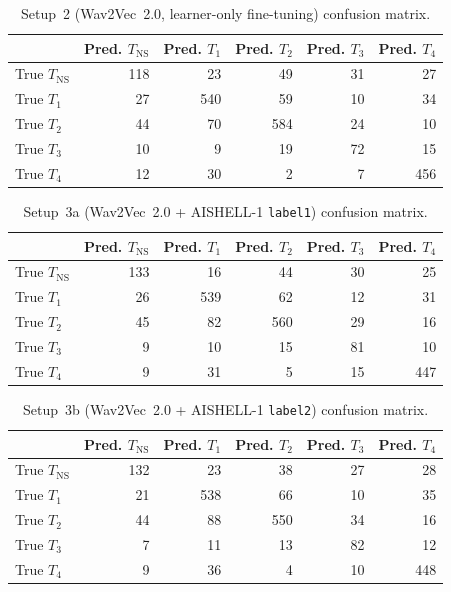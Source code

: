 \begin{table}[H]
\centering
\caption{Setup~2 (Wav2Vec~2.0, learner-only fine-tuning) confusion matrix.}
\label{tab:app:cm_w2v_learner}
\small
\begin{tabular}{@{}lrrrrr@{}}
\toprule
 & \textbf{Pred. \(T_{\mathrm{NS}}\)} & \textbf{Pred. \(T_1\)} & \textbf{Pred. \(T_2\)} & \textbf{Pred. \(T_3\)} & \textbf{Pred. \(T_4\)} \\
\midrule
True \(T_{\mathrm{NS}}\) & 118 &  23 &  49 & 31 &  27 \\
True \(T_1\)             &  27 & 540 &  59 & 10 &  34 \\
True \(T_2\)             &  44 &  70 & 584 & 24 &  10 \\
True \(T_3\)             &  10 &   9 &  19 & 72 &  15 \\
True \(T_4\)             &  12 &  30 &   2 &  7 & 456 \\
\bottomrule
\end{tabular}
\end{table}

\begin{table}[H]
\centering
\caption{Setup~3a (Wav2Vec~2.0 + AISHELL-1 \texttt{label1}) confusion matrix.}
\label{tab:app:cm_w2v_aishell_l1}
\small
\begin{tabular}{@{}lrrrrr@{}}
\toprule
 & \textbf{Pred. \(T_{\mathrm{NS}}\)} & \textbf{Pred. \(T_1\)} & \textbf{Pred. \(T_2\)} & \textbf{Pred. \(T_3\)} & \textbf{Pred. \(T_4\)} \\
\midrule
True \(T_{\mathrm{NS}}\) & 133 &  16 &  44 & 30 &  25 \\
True \(T_1\)             &  26 & 539 &  62 & 12 &  31 \\
True \(T_2\)             &  45 &  82 & 560 & 29 &  16 \\
True \(T_3\)             &   9 &  10 &  15 & 81 &  10 \\
True \(T_4\)             &   9 &  31 &   5 & 15 & 447 \\
\bottomrule
\end{tabular}
\end{table}

\begin{table}[H]
\centering
\caption{Setup~3b (Wav2Vec~2.0 + AISHELL-1 \texttt{label2}) confusion matrix.}
\label{tab:app:cm_w2v_aishell_l2}
\small
\begin{tabular}{@{}lrrrrr@{}}
\toprule
 & \textbf{Pred. \(T_{\mathrm{NS}}\)} & \textbf{Pred. \(T_1\)} & \textbf{Pred. \(T_2\)} & \textbf{Pred. \(T_3\)} & \textbf{Pred. \(T_4\)} \\
\midrule
True \(T_{\mathrm{NS}}\) & 132 &  23 &  38 & 27 &  28 \\
True \(T_1\)             &  21 & 538 &  66 & 10 &  35 \\
True \(T_2\)             &  44 &  88 & 550 & 34 &  16 \\
True \(T_3\)             &   7 &  11 &  13 & 82 &  12 \\
True \(T_4\)             &   9 &  36 &   4 & 10 & 448 \\
\bottomrule
\end{tabular}
\end{table}

